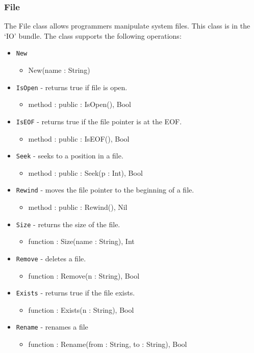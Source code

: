 \documentclass[12pt]{article}
\begin{document}
\subsubsection{File}
The File class allows programmers manipulate system files.  This class is in the `IO' bundle.  The class supports the following operations:
\begin{itemize}
\item \texttt{New}
  \begin{itemize}
  \item New(name : String)
  \end{itemize}
\item \texttt{IsOpen} - returns true if file is open.
  \begin{itemize}
  \item method : public : IsOpen(), Bool
  \end{itemize}
\item \texttt{IsEOF} - returns true if the file pointer is at the EOF.
  \begin{itemize}
  \item method : public : IsEOF(), Bool
  \end{itemize}
\item \texttt{Seek} - seeks to a position in a file.
  \begin{itemize}
  \item method : public : Seek(p : Int), Bool
  \end{itemize}
\item \texttt{Rewind} - moves the file pointer to the beginning of a file.
  \begin{itemize}
  \item method : public : Rewind(), Nil
  \end{itemize}
\item \texttt{Size} - returns the size of the file.
  \begin{itemize}
  \item function : Size(name : String), Int
  \end{itemize}
\item \texttt{Remove} - deletes a file.
  \begin{itemize}
  \item function : Remove(n : String), Bool
  \end{itemize}
\item \texttt{Exists} - returns true if the file exists.
  \begin{itemize}
  \item function : Exists(n : String), Bool
  \end{itemize}
\item \texttt{Rename} - renames a file
  \begin{itemize}
  \item function : Rename(from : String, to : String), Bool
  \end{itemize}
\end{itemize}
\end{document}
